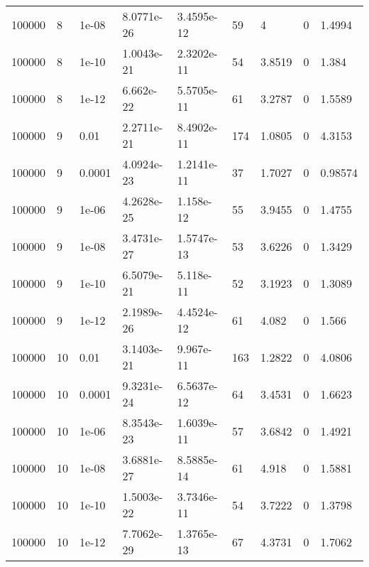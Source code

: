 \begin{tabular}{lllllllll}
100000 & 8 & 1e-08 & 8.0771e-26 & 3.4595e-12 & 59 & 4 & 0 & 1.4994 \\ 
100000 & 8 & 1e-10 & 1.0043e-21 & 2.3202e-11 & 54 & 3.8519 & 0 & 1.384 \\ 
100000 & 8 & 1e-12 & 6.662e-22 & 5.5705e-11 & 61 & 3.2787 & 0 & 1.5589 \\ 
100000 & 9 & 0.01 & 2.2711e-21 & 8.4902e-11 & 174 & 1.0805 & 0 & 4.3153 \\ 
100000 & 9 & 0.0001 & 4.0924e-23 & 1.2141e-11 & 37 & 1.7027 & 0 & 0.98574 \\ 
100000 & 9 & 1e-06 & 4.2628e-25 & 1.158e-12 & 55 & 3.9455 & 0 & 1.4755 \\ 
100000 & 9 & 1e-08 & 3.4731e-27 & 1.5747e-13 & 53 & 3.6226 & 0 & 1.3429 \\ 
100000 & 9 & 1e-10 & 6.5079e-21 & 5.118e-11 & 52 & 3.1923 & 0 & 1.3089 \\ 
100000 & 9 & 1e-12 & 2.1989e-26 & 4.4524e-12 & 61 & 4.082 & 0 & 1.566 \\ 
100000 & 10 & 0.01 & 3.1403e-21 & 9.967e-11 & 163 & 1.2822 & 0 & 4.0806 \\ 
100000 & 10 & 0.0001 & 9.3231e-24 & 6.5637e-12 & 64 & 3.4531 & 0 & 1.6623 \\ 
100000 & 10 & 1e-06 & 8.3543e-23 & 1.6039e-11 & 57 & 3.6842 & 0 & 1.4921 \\ 
100000 & 10 & 1e-08 & 3.6881e-27 & 8.5885e-14 & 61 & 4.918 & 0 & 1.5881 \\ 
100000 & 10 & 1e-10 & 1.5003e-22 & 3.7346e-11 & 54 & 3.7222 & 0 & 1.3798 \\ 
100000 & 10 & 1e-12 & 7.7062e-29 & 1.3765e-13 & 67 & 4.3731 & 0 & 1.7062 \\ 
\hline 
\end{tabular}